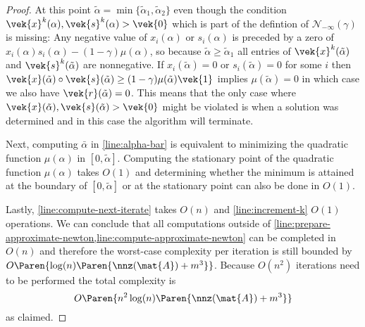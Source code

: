 \begin{proof}
  At this point \(\tilde{\alpha} = \min\{\tilde{\alpha}_1, \tilde{\alpha}_2\}\) even though the condition \(\vek{x}^k(\alpha), \vek{s}^k(\alpha) > \vek{0}\) which is part of the defintion of \(\mathcal{N}_{-\infty}(\gamma)\) is missing:
  Any negative value of \(x_i(\alpha)\) or \(s_i(\alpha)\) is preceded by a zero of \(x_i(\alpha) s_i(\alpha) - (1 - \gamma)\mu(\alpha)\), so because \(\tilde{\alpha} \geq \tilde{\alpha}_1\) all entries of \(\vek{x}^k(\tilde{\alpha})\) and \(\vek{s}^k(\tilde{\alpha})\) are nonnegative.
  If \(x_i(\tilde{\alpha}) = 0\) or \(s_i(\tilde{\alpha}) = 0\) for some \(i\) then \(\vek{x}(\tilde{\alpha}) \circ \vek{s}(\tilde{\alpha}) \geq (1 - \gamma)\mu(\tilde{\alpha}) \vek{1}\) implies \(\mu(\tilde{\alpha}) = 0\) in which case we also have \(\vek{r}(\tilde{\alpha}) = 0\).
  This means that the only case where \(\vek{x}(\tilde{\alpha}), \vek{s}(\tilde{\alpha}) > \vek{0}\) might be violated is when a solution was determined and in this case the algorithm will terminate.

  Next, computing \(\bar{\alpha}\) in \cref{line:alpha-bar} is equivalent to minimizing the quadratic function \(\mu(\alpha)\) in \([0, \tilde{\alpha}]\).
  Computing the stationary point of the quadratic function \(\mu(\alpha)\) takes \(O(1)\) and determining whether the minimum is attained at the boundary of \([0, \tilde{\alpha}]\) or at the stationary point can also be done in \(O(1)\).

  Lastly, \cref{line:compute-next-iterate} takes \(O(n)\) and \cref{line:increment-k} \(O(1)\) operations.
  We can conclude that all computations outside of \cref{line:prepare-approximate-newton,line:compute-approximate-newton} can be completed in \(O(n)\) and therefore the worst-case complexity per iteration is still bounded by \( O \Paren{\log(n) \Paren{\nnz(\mat{A}) + m^3}} \).
  Because \(O(n^2)\) iterations need to be performed the total complexity is
  \[ O \Paren{n^2 \log(n) \Paren{\nnz(\mat{A}) + m^3}} \]
  as claimed.
\end{proof}
